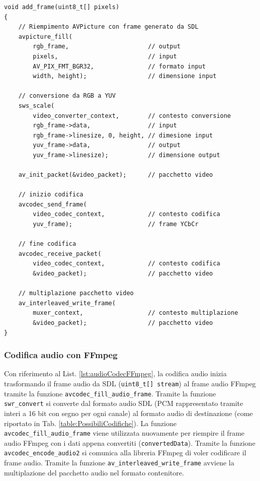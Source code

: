 \begin{lstlisting}[caption=Codice per la codifica video. File: \detokenize{lib/util/encoding/encode_to_movie.hpp}, label={lst:videoCodecFFmpeg}]
void add_frame(uint8_t[] pixels)
{
	// Riempimento AVPicture con frame generato da SDL
	avpicture_fill(
		rgb_frame, 						// output
		pixels, 						// input
		AV_PIX_FMT_BGR32,				// formato input
		width, height); 				// dimensione input

	// conversione da RGB a YUV
	sws_scale(
		video_converter_context,		// contesto conversione
		rgb_frame->data,				// input
		rgb_frame->linesize, 0, height,	// dimesione input
		yuv_frame->data, 				// output
		yuv_frame->linesize); 			// dimensione output
	
	av_init_packet(&video_packet);		// pacchetto video

	// inizio codifica
	avcodec_send_frame(
		video_codec_context,			// contesto codifica
		yuv_frame);						// frame YCbCr

	// fine codifica
	avcodec_receive_packet(
		video_codec_context,			// contesto codifica
		&video_packet);					// pacchetto video

	// multiplazione pacchetto video
	av_interleaved_write_frame(
		muxer_context,					// contesto multiplazione
		&video_packet);					// pacchetto video
}
\end{lstlisting}



\subsubsection{Codifica audio con FFmpeg}
Con riferimento al List. \ref{lst:audioCodecFFmpeg}, la codifica audio inizia trasformando il frame audio da SDL (\verb|uint8_t[] stream|) al frame audio FFmpeg tramite la funzione \verb|avcodec_fill_audio_frame|. Tramite la funzione \verb|swr_convert| si converte dal formato audio SDL (PCM rappresentato tramite interi a 16 bit con segno per ogni canale) al formato audio di destinazione (come riportato in Tab. \ref{table:PossibiliCodifiche}). La funzione \verb|avcodec_fill_audio_frame| viene utilizzata nuovamente per riempire il frame audio FFmpeg con i dati appena convertiti (\verb|convertedData|). Tramite la funzione \verb|avcodec_encode_audio2| si comunica alla libreria FFmpeg di voler codificare il frame audio. Tramite la funzione \verb|av_interleaved_write_frame| avviene la multiplazione del pacchetto audio nel formato contenitore.


